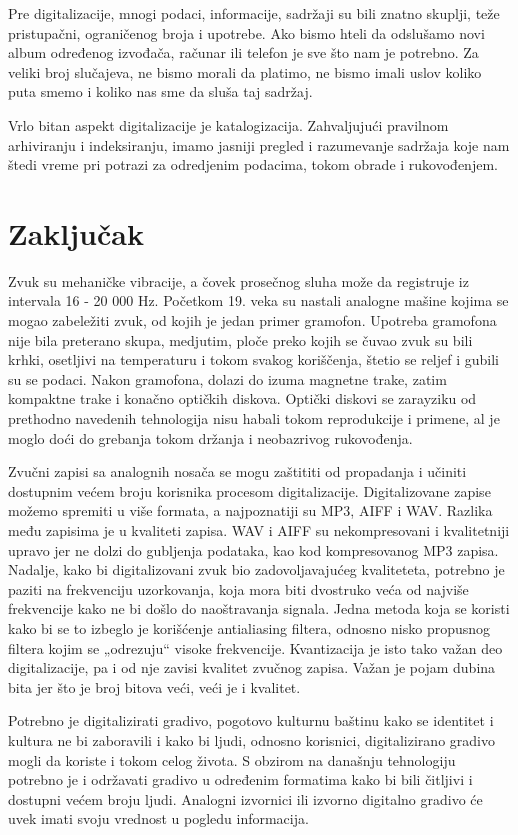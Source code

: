 \documentclass[a4paper]{article}
\begin{document}
Pre digitalizacije, mnogi podaci, informacije, sadržaji su bili znatno skuplji, teže pristupačni, ograničenog broja i upotrebe. Ako bismo hteli da odslušamo novi album određenog izvođača, računar ili telefon je sve što nam je potrebno. Za veliki broj slučajeva, ne bismo morali da platimo, ne bismo imali uslov koliko puta smemo i koliko nas sme da sluša taj sadržaj. 
 
Vrlo bitan aspekt digitalizacije je katalogizacija. Zahvaljujući pravilnom arhiviranju i indeksiranju, imamo jasniji pregled i razumevanje sadržaja koje nam štedi vreme pri potrazi za odredjenim podacima, tokom obrade i rukovođenjem.
\section{Zaključak}
\label{sec:zakljucak}

Zvuk su mehaničke vibracije, a čovek prosečnog sluha može da registruje iz intervala 16 - 20 000 Hz. Početkom 19. veka su nastali analogne mašine kojima se mogao zabeležiti zvuk, od kojih je jedan primer gramofon. Upotreba gramofona nije bila preterano skupa, medjutim, ploče preko kojih se čuvao zvuk su bili krhki, osetljivi na temperaturu i tokom svakog koriščenja, štetio se reljef i gubili su se podaci. Nakon gramofona, dolazi do izuma magnetne trake, zatim kompaktne trake i konačno optičkih diskova. Optički diskovi se zarayziku od prethodno navedenih tehnologija nisu habali tokom reprodukcije i primene, al je moglo doći do grebanja tokom držanja i neobazrivog rukovođenja.

Zvučni zapisi sa analognih nosača se mogu  zaštititi od propadanja i učiniti dostupnim većem broju korisnika procesom digitalizacije. Digitalizovane zapise možemo spremiti u više
formata, a najpoznatiji su MP3, AIFF i WAV. Razlika među zapisima je u kvaliteti zapisa. WAV i AIFF su nekompresovani i kvalitetniji upravo jer ne dolzi do gubljenja podataka, kao kod kompresovanog MP3 zapisa. Nadalje, kako bi digitalizovani
zvuk bio zadovoljavajućeg kvaliteteta, potrebno je paziti na frekvenciju uzorkovanja, koja mora biti dvostruko veća od najviše frekvencije kako ne bi došlo do naoštravanja signala. Jedna metoda koja se koristi kako bi se to izbeglo je korišćenje antialiasing filtera, odnosno nisko
propusnog filtera kojim se „odrezuju“ visoke frekvencije. Kvantizacija je isto tako važan deo digitalizacije, pa i od nje zavisi kvalitet zvučnog zapisa. Važan je pojam dubina bita jer što je broj bitova veći, veći je i kvalitet.

Potrebno je digitalizirati gradivo, pogotovo kulturnu baštinu kako se identitet i kultura ne bi zaboravili i kako bi ljudi, odnosno korisnici, digitalizirano gradivo mogli da koriste i tokom celog života. S obzirom na današnju tehnologiju potrebno je i održavati gradivo u određenim formatima kako bi bili čitljivi i dostupni većem broju ljudi.
Analogni izvornici ili izvorno digitalno gradivo će uvek imati svoju vrednost u pogledu informacija.
\end{document}
